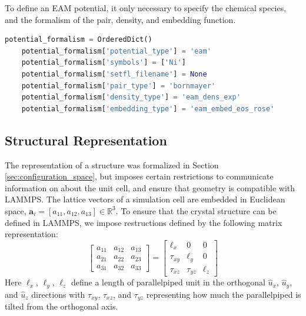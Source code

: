 To define an EAM potential, it only necessary to specify the chemical species, and the formalism of the pair, density, and embedding function.

\begin{lstlisting}[language=Python]
	potential_formalism = OrderedDict()
	potential_formalism['potential_type'] = 'eam'
	potential_formalism['symbols'] = ['Ni']
	potential_formalism['setfl_filename'] = None
	potential_formalism['pair_type'] = 'bornmayer'
	potential_formalism['density_type'] = 'eam_dens_exp'
	potential_formalism['embedding_type'] = 'eam_embed_eos_rose'
\end{lstlisting}

\subsection{Structural Representation}
\label{sec:pypospack_structures}

The representation of a structure was formalized in Section \ref{sec:configuration_space}, but imposes certain restrictions to communicate information on about the unit cell, and ensure that geometry is compatible with LAMMPS.
The lattice vectors of a simulation cell are embedded in Euclidean space,  $\bm{a}_i = [a_{11}, a_{12}, a_{13}] \in \mathbb{R}^3$.  To ensure that the crystal structure can be defined in LAMMPS, we impose restructions defined by the following matrix representation:
\begin{equation}
	\begin{bmatrix}
		a_{11} & a_{12} & a_{13} \\
		a_{21} & a_{22} & a_{23} \\
		a_{31} & a_{32} & a_{33}
	\end{bmatrix}
	=
	\begin{bmatrix}
		\ell_x    & 0         & 0     \\
		\tau_{xy} & \ell_y    & 0     \\
		\tau_{xz} & \tau_{yz} & \ell_z
	\end{bmatrix}
\end{equation}
Here $\ell_x$, $\ell_y$, $\ell_z$ define a length of parallelpiped unit in the orthogonal $\hat{u}_x$, $\hat{u}_y$, and $\hat{u}_z$ directions with $\tau_{xy}$, $\tau_{xz}$, and $\tau_{yz}$ representing how much the parallelpiped is tilted from the orthogonal axis.


